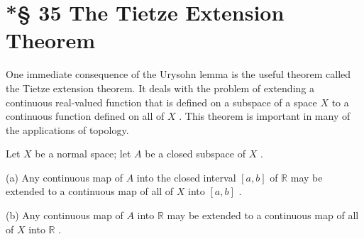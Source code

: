 \section*{*§ 35 The Tietze Extension Theorem \protect\sectionDagger}

One immediate consequence of the Urysohn lemma is the useful theorem called the Tietze extension theorem. It deals with the problem of extending a continuous real-valued function that is defined on a subspace of a space \(X\) to a continuous function defined on all of \(X\) . This theorem is important in many of the applications of topology.

\begin{theorem}
	Let \(X\) be a normal space; let \(A\) be a closed subspace of \(X\) .

(a) Any continuous map of \(A\) into the closed interval \(\left\lbrack  {a,b}\right\rbrack\) of \(\mathbb{R}\) may be extended to a continuous map of all of \(X\) into \(\left\lbrack  {a,b}\right\rbrack\) .

(b) Any continuous map of \(A\) into \(\mathbb{R}\) may be extended to a continuous map of all of \(X\) into \(\mathbb{R}\) .

\end{theorem}
